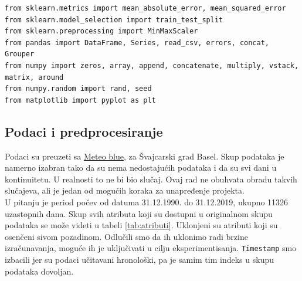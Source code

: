 \documentclass[a4paper]{article}
\begin{document}
\begin{verbatim}
from sklearn.metrics import mean_absolute_error, mean_squared_error
from sklearn.model_selection import train_test_split
from sklearn.preprocessing import MinMaxScaler
from pandas import DataFrame, Series, read_csv, errors, concat, Grouper
from numpy import zeros, array, append, concatenate, multiply, vstack, matrix, around
from numpy.random import rand, seed
from matplotlib import pyplot as plt
\end{verbatim}

\subsection{Podaci i predprocesiranje}
Podaci su preuzeti sa \href{https://www.meteoblue.com/en/weather/archive/export/basel_switzerland_2661604}{Meteo blue}, za Švajcarski grad Basel. Skup podataka je namerno izabran tako da su nema nedostajućih podataka i da su svi dani u kontinuitetu. U realnosti to ne bi bio slučaj. Ovaj rad ne obuhvata obradu takvih slučajeva, ali je jedan od mogućih koraka za unapređenje projekta.
\\
U pitanju je period počev od datuma 31.12.1990. do 31.12.2019, ukupno 11326 uzastopnih dana.
Skup svih atributa koji su dostupni u originalnom skupu podataka se može videti u tabeli \ref{tab:atributi}. Uklonjeni su atributi koji su osenčeni sivom pozadinom. Odlučili smo da ih uklonimo radi brzine izračunavanja, moguće ih je uključivati u cilju eksperimentisanja. \texttt{Timestamp} smo izbacili jer su podaci učitavani hronološki, pa je samim tim indeks u skupu podataka dovoljan.
\end{document}
